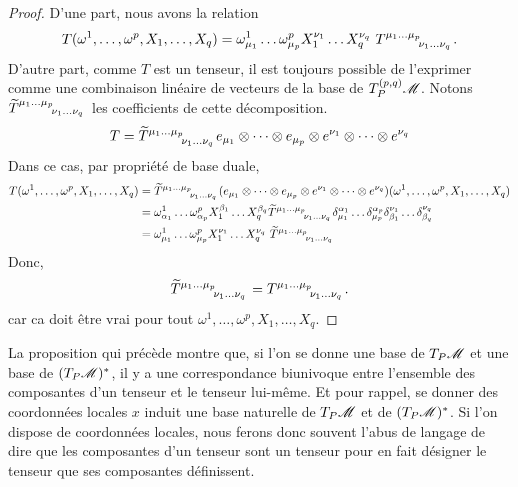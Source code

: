 \documentclass[a4paper,11pt]{report}
\begin{document}
                \begin{proof}
                    D'une part, nous avons la relation
                    \begin{equation}
                         T(\omega^1,\dots,\omega^p,X_1,\dots,X_q) = \omega^1_{\mu_1}\dots\omega^p_{\mu_p}X^{\nu_1}_1\dots X^{\nu_q}_q~ T\indices{^{\mu_1\dots\mu_p}_{\nu_1\dots\nu_q}}.
                    \end{equation}
                    D'autre part, comme $T$ est un tenseur, il est toujours possible de l'exprimer comme une combinaison linéaire de vecteurs de la base de $T^{(p,q)}_P\mathscr{M}$. Notons $\widetilde{T}\indices{^{\mu_1\dots\mu_p}_{\nu_1\dots\nu_q}}$ les coefficients de cette décomposition.
                    \begin{equation}
                        T = \widetilde{T}\indices{^{\mu_1\dots\mu_p}_{\nu_1\dots\nu_q}} e_{\mu_1}\otimes\dots\otimes e_{\mu_p}\otimes e^{\nu_1}\otimes\dots\otimes e^{\nu_q}
                    \end{equation}
                    Dans ce cas, par propriété de base duale,
                    \begin{align}
                        T(\omega^1,\dots,\omega^p,X_1,\dots,X_q) &= \widetilde{T}\indices{^{\mu_1\dots\mu_p}_{\nu_1\dots\nu_q}} (e_{\mu_1}\otimes\dots\otimes e_{\mu_p}\otimes e^{\nu_1}\otimes\dots\otimes e^{\nu_q})(\omega^1,\dots,\omega^p,X_1,\dots,X_q)\\
                        &= \omega^1_{\alpha_1}\dots\omega^p_{\alpha_p}X^{\beta_1}_1\dots X^{\beta_q}_q \widetilde{T}\indices{^{\mu_1\dots\mu_p}_{\nu_1\dots\nu_q}} \delta^{\alpha_1}_{\mu_1}\dots\delta^{\alpha_p}_{\mu_p}\delta^{\nu_1}_{\beta_1}\dots\delta^{\nu_q}_{\beta_q}\\
                        &= \omega^1_{\mu_1}\dots\omega^p_{\mu_p}X^{\nu_1}_1\dots X^{\nu_q}_q~ \widetilde{T}\indices{^{\mu_1\dots\mu_p}_{\nu_1\dots\nu_q}}
                    \end{align}
                    Donc, 
                    \begin{equation}
                        \widetilde{T}\indices{^{\mu_1\dots\mu_p}_{\nu_1\dots\nu_q}} = T\indices{^{\mu_1\dots\mu_p}_{\nu_1\dots\nu_q}}.
                    \end{equation}
                    car ca doit être vrai pour tout $\omega^1,\dots,\omega^p,X_1,\dots,X_q$.
                \end{proof}
                
                \begin{rmk}
                    La proposition qui précède montre que, si l'on se donne une base de $T_P\mathscr{M}$ et une base de $(T_P\mathscr{M})^*$, il y a une correspondance biunivoque entre l'ensemble des composantes d'un tenseur et le tenseur lui-même. Et pour rappel, se donner des coordonnées locales $x$ induit une base naturelle de $T_P\mathscr{M}$ et de $(T_P\mathscr{M})^*$. Si l'on dispose de coordonnées locales, nous ferons donc souvent l'abus de langage de dire que les composantes d'un tenseur sont un tenseur pour en fait désigner le tenseur que ses composantes définissent.
                \end{rmk}
                
\end{document}
